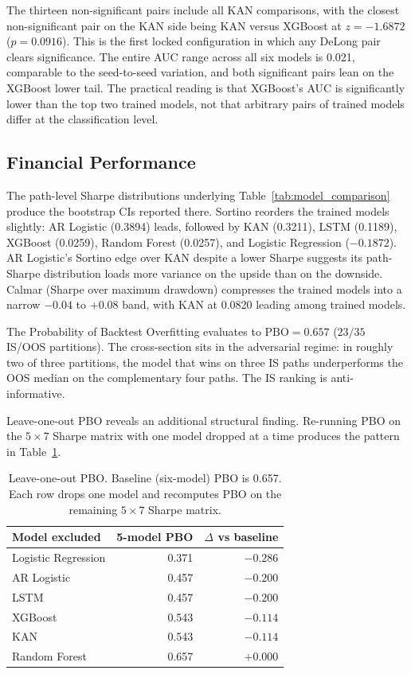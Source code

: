 \documentclass[12pt,a4paper,oneside]{article}
\begin{document}
The thirteen non-significant pairs include all KAN comparisons, with the closest non-significant pair on the KAN side being KAN versus XGBoost at $z = -1.6872$ ($p = 0.0916$). This is the first locked configuration in which any DeLong pair clears significance. The entire AUC range across all six models is 0.021, comparable to the seed-to-seed variation, and both significant pairs lean on the XGBoost lower tail. The practical reading is that XGBoost's AUC is significantly lower than the top two trained models, not that arbitrary pairs of trained models differ at the classification level.


\subsection{Financial Performance}\label{subsec:results_financial}

The path-level Sharpe distributions underlying Table~\ref{tab:model_comparison} produce the bootstrap CIs reported there. Sortino reorders the trained models slightly: AR Logistic (0.3894) leads, followed by KAN (0.3211), LSTM (0.1189), XGBoost (0.0259), Random Forest (0.0257), and Logistic Regression ($-0.1872$). AR Logistic's Sortino edge over KAN despite a lower Sharpe suggests its path-Sharpe distribution loads more variance on the upside than on the downside. Calmar (Sharpe over maximum drawdown) compresses the trained models into a narrow $-0.04$ to $+0.08$ band, with KAN at 0.0820 leading among trained models.

The Probability of Backtest Overfitting evaluates to $\text{PBO} = 0.657$ ($23 / 35$ IS/OOS partitions). The cross-section sits in the adversarial regime: in roughly two of three partitions, the model that wins on three IS paths underperforms the OOS median on the complementary four paths. The IS ranking is anti-informative.

Leave-one-out PBO reveals an additional structural finding. Re-running PBO on the $5 \times 7$ Sharpe matrix with one model dropped at a time produces the pattern in Table~\ref{tab:loo_pbo}.

\begin{table}[H]
\centering
\footnotesize
\begin{tabular}{lrr}
\toprule
Model excluded & 5-model PBO & $\Delta$ vs baseline \\
\midrule
Logistic Regression  & 0.371 & $-0.286$ \\
AR Logistic          & 0.457 & $-0.200$ \\
LSTM                 & 0.457 & $-0.200$ \\
XGBoost              & 0.543 & $-0.114$ \\
KAN                  & 0.543 & $-0.114$ \\
Random Forest        & 0.657 & $+0.000$ \\
\bottomrule
\end{tabular}
\caption{Leave-one-out PBO. Baseline (six-model) PBO is 0.657. Each row drops one model and recomputes PBO on the remaining $5 \times 7$ Sharpe matrix.}
\label{tab:loo_pbo}
\end{table}
\end{document}
